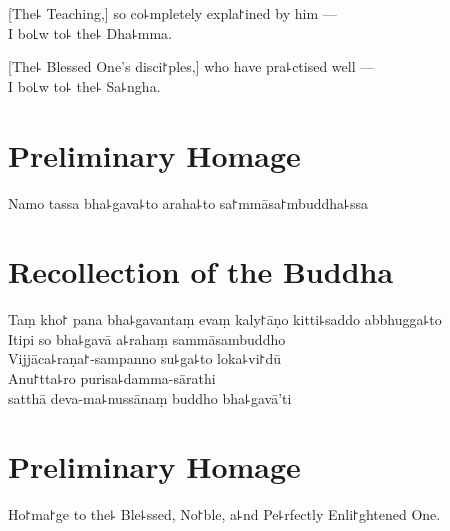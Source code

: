 [The꜕ Teaching,] so co꜕mpletely expla꜓ined by him ---\\
I bo꜖w to꜕ the꜕ Dha꜕mma. 

[The꜕ Blessed One's disci꜓ples,] who have pra꜕ctised well ---\\
I bo꜖w to꜕ the꜕ Sa꜕ngha. 

\clearpage

\chPali
\chapter{Preliminary Homage}%

\begin{leader}
\end{leader}

Namo tassa bha꜕gava꜕to araha꜕to sa꜓mmāsa꜓mbuddha꜕ssa


\chPali
\chapter{Recollection of the Buddha}%

\begin{leader}
\end{leader}

Taṃ kho꜓ pana bha꜕gavantaṃ evaṃ kaly꜓āṇo kitti꜕saddo abbhugga꜕to\\
Itipi so bha꜕gavā a꜕rahaṃ sammāsambuddho\\
Vijjāca꜕raṇa꜓-sampanno su꜕ga꜕to loka꜕vi꜓dū\\
Anu꜓tta꜕ro purisa꜕damma-sārathi\\
\vin satthā deva-ma꜕nussānaṃ buddho bha꜕gavā'ti

\clearpage

\chEnglish
\chapter{Preliminary Homage}%

\begin{leader}
\end{leader}

Ho꜓ma꜓ge to the꜕ Ble꜕ssed, No꜓ble, a꜕nd Pe꜕rfectly Enli꜓ghtened One.


\chEnglish
